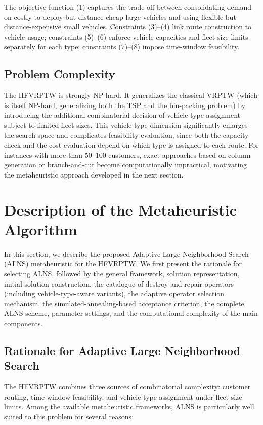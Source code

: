 \documentclass[11pt]{article}
\begin{document}
The objective function (1) captures the trade-off between consolidating demand on costly-to-deploy but distance-cheap large vehicles and using flexible but distance-expensive small vehicles. Constraints (3)--(4) link route construction to vehicle usage; constraints (5)--(6) enforce vehicle capacities and fleet-size limits separately for each type; constraints (7)--(8) impose time-window feasibility.

\subsection{Problem Complexity}

The HFVRPTW is strongly NP-hard. It generalizes the classical VRPTW (which is itself NP-hard, generalizing both the TSP and the bin-packing problem) by introducing the additional combinatorial decision of vehicle-type assignment subject to limited fleet sizes. This vehicle-type dimension significantly enlarges the search space and complicates feasibility evaluation, since both the capacity check and the cost evaluation depend on which type is assigned to each route. For instances with more than $50$--$100$ customers, exact approaches based on column generation or branch-and-cut become computationally impractical, motivating the metaheuristic approach developed in the next section.

\section{Description of the Metaheuristic Algorithm}

In this section, we describe the proposed Adaptive Large Neighborhood Search (ALNS) metaheuristic for the HFVRPTW. We first present the rationale for selecting ALNS, followed by the general framework, solution representation, initial solution construction, the catalogue of destroy and repair operators (including vehicle-type-aware variants), the adaptive operator selection mechanism, the simulated-annealing-based acceptance criterion, the complete ALNS scheme, parameter settings, and the computational complexity of the main components.

\subsection{Rationale for Adaptive Large Neighborhood Search}

The HFVRPTW combines three sources of combinatorial complexity: customer routing, time-window feasibility, and vehicle-type assignment under fleet-size limits. Among the available metaheuristic frameworks, ALNS is particularly well suited to this problem for several reasons:
\end{document}
